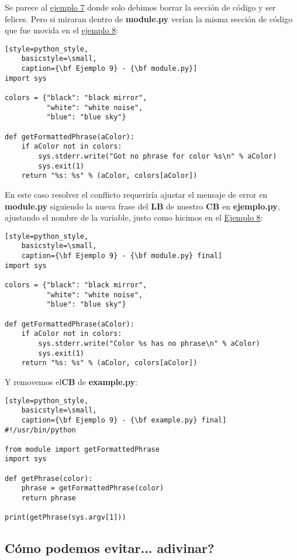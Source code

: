 Se parece al \hyperref[example_07]{ejemplo 7} donde solo debimos borrar la sección de código y ser felices. Pero si
miraran dentro de {\bf module.py} verían la misma sección de código que fue movida en el \hyperref[example_08]{ejemplo 8}:

\begin{lstlisting}[style=python_style,
	basicstyle=\small,
	caption={\bf Ejemplo 9} - {\bf module.py}]
import sys

colors = {"black": "black mirror",
          "white": "white noise",
          "blue": "blue sky"}

def getFormattedPhrase(aColor):
    if aColor not in colors:
        sys.stderr.write("Got no phrase for color %s\n" % aColor)
        sys.exit(1)
    return "%s: %s" % (aColor, colors[aColor])
\end{lstlisting}
En este caso resolver el conflicto requeriría ajustar el mensaje de error en {\bf module.py} siguiendo la nueva
frase del {\bf LB} de nuestro {\bf CB} en {\bf ejemplo.py}, ajustando el nombre de la variable, justo como hicimos
en el \hyperref[example_08]{Ejemplo 8}:

\begin{lstlisting}[style=python_style,
	basicstyle=\small,
	caption={\bf Ejemplo 9} - {\bf module.py} final]
import sys

colors = {"black": "black mirror",
          "white": "white noise",
          "blue": "blue sky"}

def getFormattedPhrase(aColor):
    if aColor not in colors:
        sys.stderr.write("Color %s has no phrase\n" % aColor)
        sys.exit(1)
    return "%s: %s" % (aColor, colors[aColor])
\end{lstlisting}

Y removemos el{\bf CB} de {\bf example.py}:

\begin{lstlisting}[style=python_style,
	basicstyle=\small,
	caption={\bf Ejemplo 9} - {\bf example.py} final]
#!/usr/bin/python

from module import getFormattedPhrase
import sys

def getPhrase(color):
    phrase = getFormattedPhrase(color)
    return phrase

print(getPhrase(sys.argv[1]))
\end{lstlisting}

\subsection{Cómo podemos evitar... adivinar?}

